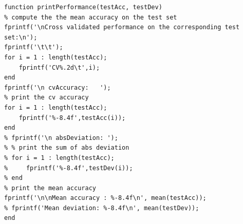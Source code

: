\documentclass[paper=a4, fontsize=11pt]{scrartcl} %
\numberwithin{equation}{section} %
\numberwithin{figure}{section} %
\numberwithin{table}{section} %
\begin{document}
\begin{lstlisting}
function printPerformance(testAcc, testDev)
% compute the the mean accuracy on the test set
fprintf('\nCross validated performance on the corresponding test set:\n');
fprintf('\t\t');
for i = 1 : length(testAcc);
    fprintf('CV%.2d\t',i);
end
fprintf('\n cvAccuracy:   ');
% print the cv accuracy
for i = 1 : length(testAcc);
    fprintf('%-8.4f',testAcc(i));
end
% fprintf('\n absDeviation: ');
% % print the sum of abs deviation 
% for i = 1 : length(testAcc);
%     fprintf('%-8.4f',testDev(i));
% end
% print the mean accuracy
fprintf('\n\nMean accuracy : %-8.4f\n', mean(testAcc));
% fprintf('Mean deviation: %-8.4f\n', mean(testDev));
end


\end{lstlisting}
\end{document}
